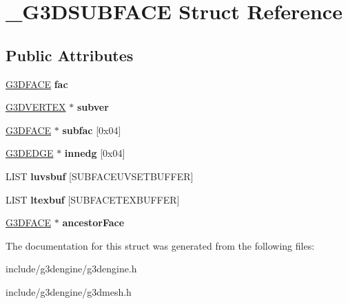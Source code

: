 \hypertarget{struct__G3DSUBFACE}{}\section{\+\_\+\+G3\+D\+S\+U\+B\+F\+A\+CE Struct Reference}
\label{struct__G3DSUBFACE}
\subsection*{Public Attributes}
\begin{DoxyCompactItemize}
\item 
\mbox{\label{struct__G3DSUBFACE_ac90c1d64af3dd7c92b39be560b1759e5}} 
\hyperlink{struct__G3DFACE}{G3\+D\+F\+A\+CE} {\bfseries fac}
\item 
\mbox{\label{struct__G3DSUBFACE_ac5841c3f861198e7b8ddf0ed357fa65d}} 
\hyperlink{struct__G3DVERTEX}{G3\+D\+V\+E\+R\+T\+EX} $\ast$ {\bfseries subver}
\item 
\mbox{\label{struct__G3DSUBFACE_ad0db763c037f4480265e6c59ca37c44a}} 
\hyperlink{struct__G3DFACE}{G3\+D\+F\+A\+CE} $\ast$ {\bfseries subfac} \mbox{[}0x04\mbox{]}
\item 
\mbox{\label{struct__G3DSUBFACE_ac0a125b223d723cfaa7b40cadf68c5b6}} 
\hyperlink{struct__G3DEDGE}{G3\+D\+E\+D\+GE} $\ast$ {\bfseries innedg} \mbox{[}0x04\mbox{]}
\item 
\mbox{\label{struct__G3DSUBFACE_a4e30713224ccdac2f88d1017346980a7}} 
L\+I\+ST {\bfseries luvsbuf} \mbox{[}S\+U\+B\+F\+A\+C\+E\+U\+V\+S\+E\+T\+B\+U\+F\+F\+ER\mbox{]}
\item 
\mbox{\label{struct__G3DSUBFACE_aebce51010d2f7824e25426e4b536f329}} 
L\+I\+ST {\bfseries ltexbuf} \mbox{[}S\+U\+B\+F\+A\+C\+E\+T\+E\+X\+B\+U\+F\+F\+ER\mbox{]}
\item 
\mbox{\label{struct__G3DSUBFACE_a54e369c88d8ba90284dfb5275013585e}} 
\hyperlink{struct__G3DFACE}{G3\+D\+F\+A\+CE} $\ast$ {\bfseries ancestor\+Face}
\end{DoxyCompactItemize}


The documentation for this struct was generated from the following files\+:\begin{DoxyCompactItemize}
\item 
include/g3dengine/g3dengine.\+h\item 
include/g3dengine/g3dmesh.\+h\end{DoxyCompactItemize}
